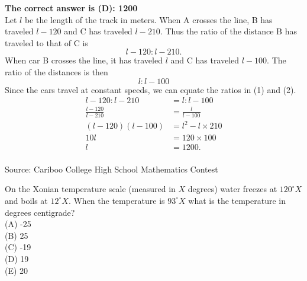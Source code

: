 \documentclass{article}
\begin{document}

\textbf{The correct answer is (D): 1200}\\[1 ex]
Let $l$ be the length of the track in meters. When A crosses the line, B has traveled $l-120$ and C has traveled $l-210$. Thus the ratio of the distance B has traveled to that of C is
\begin{equation}
l-120:l-210.
\end{equation}
When car B crosses the line, it has traveled $l$ and C has traveled $l-100$. The ratio of the distances is then
\begin{equation}
l:l-100
\end{equation}
Since the cars travel at constant speeds, we can equate the ratios in (1) and (2).
\begin{align*}
l-120:l-210&=l:l-100\\
\frac{l-120}{l-210}&=\frac{l}{l-100}\\
(l-120)(l-100)&=l^{2}-l\times210\\
10l&=120\times100\\
l&=1200.
\end{align*}
\\[5 ex]

\scriptsize
Source: Cariboo College High School Mathematics Contest

\normalsize
On the Xonian temperature scale (measured in $X$ degrees) water freezes at $120^{\circ}X$ and boils at $12^{\circ}X$. When the temperature is $93^{\circ}X$ what is the temperature in degrees centigrade?\\
(A) -25\\
(B) 25\\
(C) -19\\
(D) 19\\
(E) 20\\

\end{document}

